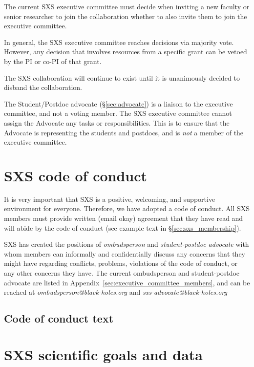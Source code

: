 \documentclass[12pt]{article}
\begin{document}
The current SXS executive committee must decide when inviting a new
faculty or senior researcher to join the collaboration whether to
also invite them to join the executive committee.

In general, the SXS executive committee reaches decisions via majority
vote.  However, any decision that involves resources from a specific
grant can be vetoed by the PI or co-PI of that grant.

The SXS collaboration will continue to exist until it is unanimously
decided to disband the collaboration.

The Student/Postdoc advocate (\S\ref{sec:advocate}) is a liaison to the
executive committee, and not a voting member.  The SXS executive
committee cannot assign the Advocate any tasks or
responsibilities. This is to ensure that the Advocate is representing
the students and postdocs, and is \textit{not} a member of the
executive committee.

\section{SXS code of conduct}\label{sec:code_of_conduct}

It is very important that SXS is a positive, welcoming, and supportive
environment for everyone.  Therefore, we have adopted a code of
conduct.  All SXS members must provide written (email okay) agreement
that they have read and will abide by the code of conduct (see example
text in \S\ref{sec:sxs_membership}).

SXS has created the positions of \emph{ombudsperson} and
\emph{student-postdoc advocate} with whom members can informally and
confidentially discuss any concerns that they might have regarding
conflicts, problems, violations of the code of conduct, or any other
concerns they have.  The current ombudsperson and student-postdoc
advocate are listed in Appendix~\ref{sec:executive_committee_members},
and can be reached at \emph{ombudsperson@black-holes.org} and
\emph{sxs-advocate@black-holes.org}

\subsection{Code of conduct text}



\section{SXS scientific goals and data}\label{sec:goals_and_data}
\end{document}

